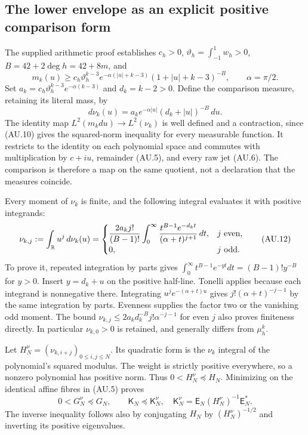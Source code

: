 \subsection{The lower envelope as an explicit positive comparison form}

The supplied arithmetic proof establishes $c_h>0$,
$\vartheta_h=\int_{-1}^1w_h>0$, $B=42+2\deg h=42+8m$, and
\[
 m_k(u)\ge c_h\vartheta_h^{k-3}
 e^{-\alpha(|u|+k-3)}(1+|u|+k-3)^{-B},\qquad\alpha=\pi/2.
 \tag{AU.10}
\]
Set $a_k=c_h\vartheta_h^{k-3}e^{-\alpha(k-3)}$ and $d_k=k-2>0$.
Define the comparison measure, retaining its literal mass, by
\[
 d\nu_k(u)=a_k e^{-\alpha|u|}(d_k+|u|)^{-B}\,du.
 \tag{AU.11}
\]
The identity map $L^2(m_kdu)\to L^2(\nu_k)$ is well defined and a
contraction, since (AU.10) gives the squared-norm inequality for every
measurable function. It restricts to the identity on each polynomial
space and commutes with multiplication by $c+iu$, remainder (AU.5),
and every raw jet (AU.6). The comparison is therefore a map on the same
quotient, not a declaration that the measures coincide.

Every moment of $\nu_k$ is finite, and the following integral evaluates
it with positive integrands:
\[
 \nu_{k,j}:=\int_\mathbb R u^j\,d\nu_k(u)=
 \begin{cases}
 \displaystyle\frac{2a_kj!}{(B-1)!}
 \int_0^\infty\frac{t^{B-1}e^{-d_kt}}{(\alpha+t)^{j+1}}\,dt,
   &j\text{ even},\\
 0,&j\text{ odd}.
 \end{cases}                                                \tag{AU.12}
\]
To prove it, repeated integration by parts gives
$\int_0^\infty t^{B-1}e^{-yt}dt=(B-1)!y^{-B}$ for $y>0$.
Insert $y=d_k+u$ on the positive half-line. Tonelli applies because
each integrand is nonnegative there. Integrating $u^je^{-(\alpha+t)u}$
gives $j!(\alpha+t)^{-j-1}$ by the same integration by parts. Evenness
supplies the factor two or the vanishing odd moment. The bound
$\nu_{k,j}\le2a_kd_k^{-B}j!\alpha^{-j-1}$ for even $j$ also proves
finiteness directly. In particular $\nu_{k,0}>0$ is retained, and
generally differs from $\mu_h^k$.

Let $H_N^\nu=(\nu_{k,i+j})_{0\le i,j\le N}$. Its quadratic form is
the $\nu_k$ integral of the polynomial's squared modulus. The weight
is strictly positive everywhere, so a nonzero polynomial has positive
norm. Thus $0<H_N^\nu\preceq H_N$. Minimizing on the identical
affine fibres in (AU.5) proves
\[
 0<G_N^\nu\preceq G_N,\qquad
 \mathsf K_N\preceq\mathsf K_N^\nu,
 \quad \mathsf K_N^\nu=\mathsf E_N(H_N^\nu)^{-1}\mathsf E_N^*.
 \tag{AU.13}
\]
The inverse inequality follows also by conjugating $H_N$ by
$(H_N^\nu)^{-1/2}$ and inverting its positive eigenvalues.

